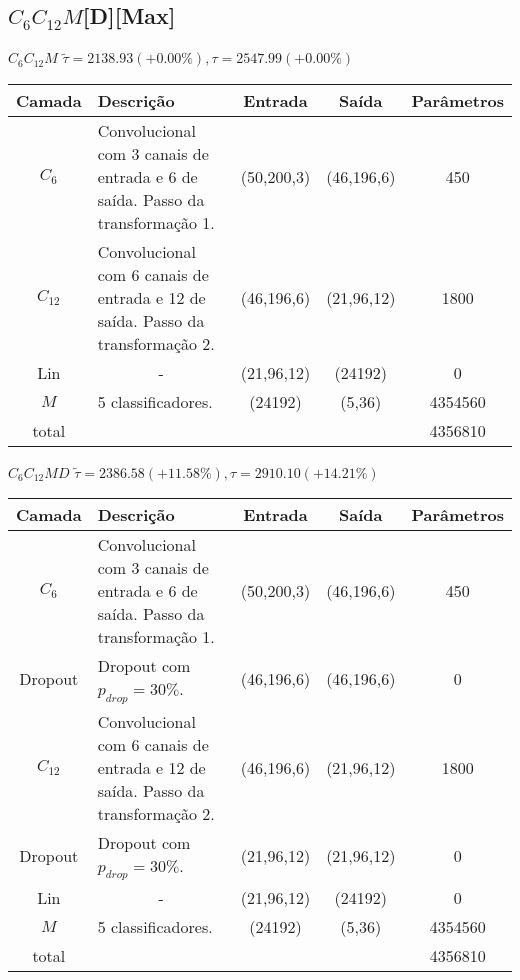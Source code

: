 \begin{tiny}
\section*{$C_6C_{12}M$[D][Max]}

\begin{table}[H]
	$C_6C_{12}M$ $\tilde{\tau}=2138.93 (+0.00\%), \tau=2547.99 (+0.00\%)$\newline
	\begin{tabularx}{\linewidth}{ |c|X|c|c|c| }
		\hline
		Camada & Descrição & Entrada & Saída & Parâmetros \\ \hline
		$C_{6}$ & Convolucional com 3 canais de entrada e 6 de saída. Passo da transformação 1. & (50,200,3) & (46,196,6) & 450 \\ \hline
		$C_{12}$ & Convolucional com 6 canais de entrada e 12 de saída. Passo da transformação 2. & (46,196,6) & (21,96,12) & 1800 \\ \hline
		Lin & \multicolumn{1}{c|}{-} & (21,96,12) & (24192) & 0 \\ \hline
		$M$ & 5 classificadores. & (24192) & (5,36) & 4354560 \\ \hline
		total &  &  &  & 4356810 \\ \hline
	\end{tabularx}
\end{table}

\begin{table}[H]
	$C_6C_{12}MD$ $\tilde{\tau}=2386.58 (+11.58\%), \tau=2910.10 (+14.21\%)$\newline
	\begin{tabularx}{\linewidth}{ |c|X|c|c|c| }
		\hline
		Camada & Descrição & Entrada & Saída & Parâmetros \\ \hline
		$C_{6}$ & Convolucional com 3 canais de entrada e 6 de saída. Passo da transformação 1. & (50,200,3) & (46,196,6) & 450 \\ \hline
		Dropout & Dropout com $p_{drop} = 30\%$. & (46,196,6) & (46,196,6) & 0 \\ \hline
		$C_{12}$ & Convolucional com 6 canais de entrada e 12 de saída. Passo da transformação 2. & (46,196,6) & (21,96,12) & 1800 \\ \hline
		Dropout & Dropout com $p_{drop} = 30\%$. & (21,96,12) & (21,96,12) & 0 \\ \hline
		Lin & \multicolumn{1}{c|}{-} & (21,96,12) & (24192) & 0 \\ \hline
		$M$ & 5 classificadores. & (24192) & (5,36) & 4354560 \\ \hline
		total &  &  &  & 4356810 \\ \hline
	\end{tabularx}
\end{table}


\end{tiny}
